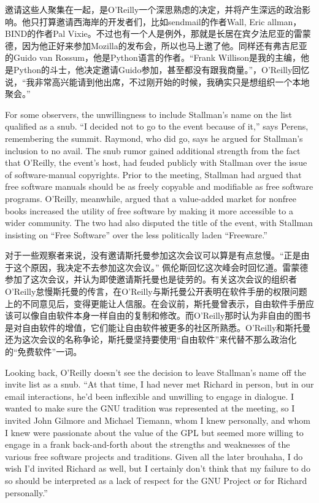 \ifdefined\chs
邀请这些人聚集在一起，是O'Reilly一个深思熟虑的决定，并将产生深远的政治影响。他只打算邀请西海岸的开发者们，比如sendmail的作者Wall, Eric allman，BIND的作者Pal Vixie。不过也有一个人是例外，那就是长居在宾夕法尼亚的雷蒙德，因为他正好来参加Mozilla的发布会，所以也马上邀了他。同样还有弗吉尼亚的Guido van Rossum，他是Python语言的作者。``Frank Willison是我的主编，他是Python的斗士，他决定邀请Guido参加，甚至都没有跟我商量。''，O'Reilly回忆说，``我非常高兴能请到他出席，不过刚开始的时候，我确实只是想组织一个本地聚会。''
\fi

\ifdefined\eng
For some observers, the unwillingness to include Stallman's name on the list qualified as a snub. ``I decided not to go to the event because of it,'' says Perens, remembering the summit. Raymond, who did go, says he argued for Stallman's inclusion to no avail. The snub rumor gained additional strength from the fact that O'Reilly, the event's host, had feuded publicly with Stallman over the issue of software-manual copyrights. Prior to the meeting, Stallman had argued that free software manuals should be as freely copyable and modifiable as free software programs. O'Reilly, meanwhile, argued that a value-added market for nonfree books increased the utility of free software by making it more accessible to a wider community. The two had also disputed the title of the event, with Stallman insisting on ``Free Software'' over the less politically laden ``Freeware.''
\fi

\ifdefined\chs
对于一些观察者来说，没有邀请斯托曼参加这次会议可以算是有点怠慢。``正是由于这个原因，我决定不去参加这次会议。'' 佩伦斯回忆这次峰会时回忆道。雷蒙德参加了这次会议，并认为即使邀请斯托曼也是徒劳的。有关这次会议的组织者O'Reilly怠慢斯托曼的传言，在O'Reilly与斯托曼公开表明在软件手册的权限问题上的不同意见后，变得更能让人信服。在会议前，斯托曼曾表示，自由软件手册应该可以像自由软件本身一样自由的复制和修改。而O'Reilly那时认为非自由的图书是对自由软件的增值，它们能让自由软件被更多的社区所熟悉。O'Reilly和斯托曼还为这次会议的名称争论，斯托曼坚持要使用``自由软件''来代替不那么政治化的``免费软件''一词。
\fi

\ifdefined\eng
Looking back, O'Reilly doesn't see the decision to leave Stallman's name off the invite list as a snub. ``At that time, I had never met Richard in person, but in our email interactions, he'd been inflexible and unwilling to engage in dialogue. I wanted to make sure the GNU tradition was represented at the meeting, so I invited John Gilmore and Michael Tiemann, whom I knew personally, and whom I knew were passionate about the value of the GPL but seemed more willing to engage in a frank back-and-forth about the strengths and weaknesses of the various free software projects and traditions. Given all the later brouhaha, I do wish I'd invited Richard as well, but I certainly don't think that my failure to do so should be interpreted as a lack of respect for the GNU Project or for Richard personally.''
\fi

